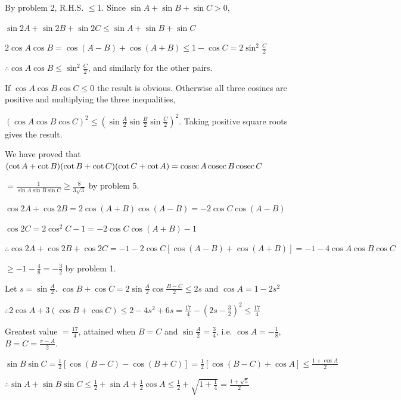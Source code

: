   By problem 2, R.H.S. $\leq 1$. Since $\sin A + \sin B + \sin C > 0$,

  $\sin 2A + \sin 2B + \sin 2C \leq \sin A + \sin B + \sin C$

\item $2\cos A\cos B = \cos(A - B) + \cos(A + B) \leq 1 - \cos C = 2\sin^2\frac{C}{2}$

  $\therefore \cos A\cos B \leq \sin^2\frac{C}{2}$, and similarly for the other pairs.

  If $\cos A\cos B\cos C \leq 0$ the result is obvious. Otherwise all three cosines are positive and multiplying the
  three inequalities,

  $(\cos A\cos B\cos C)^2 \leq \left(\sin\frac{A}{2}\sin\frac{B}{2}\sin\frac{C}{2}\right)^2$. Taking positive square
  roots gives the result.

\item We have proved that $(\cot A + \cot B)(\cot B + \cot C)(\cot C + \cot A) = {\rm cosec}\,A\,{\rm cosec}\,B\,{\rm
    cosec}\,C$

  $= \frac{1}{\sin A\sin B\sin C} \geq \frac{8}{3\sqrt{3}}$ by problem 5.

\item $\cos 2A + \cos 2B = 2\cos(A + B)\cos(A - B) = -2\cos C\cos(A - B)$

  $\cos 2C = 2\cos^2C - 1 = -2\cos C\cos(A + B) - 1$

  $\therefore \cos 2A + \cos 2B + \cos 2C = -1 - 2\cos C[\cos(A - B) + \cos(A + B)] = -1 - 4\cos A\cos B\cos C$

  $\geq -1 - \frac{4}{8} = -\frac{3}{2}$ by problem 1.

\item Let $s = \sin\frac{A}{2}$. $\cos B + \cos C = 2\sin\frac{A}{2}\cos\frac{B - C}{2} \leq 2s$ and $\cos A = 1 - 2s^2$

  $\therefore 2\cos A + 3(\cos B + \cos C) \leq 2 - 4s^2 + 6s = \frac{17}{4} - \left(2s - \frac{3}{2}\right)^2 \leq
  \frac{17}{4}$

  Greatest value $= \frac{17}{4}$, attained when $B = C$ and $\sin\frac{A}{2} = \frac{3}{4}$, i.e. $\cos A =
  -\frac{1}{8}$, $B = C = \frac{\pi - A}{2}$.

\item $\sin B\sin C = \frac{1}{2}[\cos(B - C) - \cos(B + C)] = \frac{1}{2}[\cos(B - C) + \cos A] \leq \frac{1 + \cos
  A}{2}$

  $\therefore \sin A + \sin B\sin C \leq \frac{1}{2} + \sin A + \frac{1}{2}\cos A \leq \frac{1}{2} + \sqrt{1 +
    \frac{1}{4}} = \frac{1 + \sqrt{5}}{2}$

